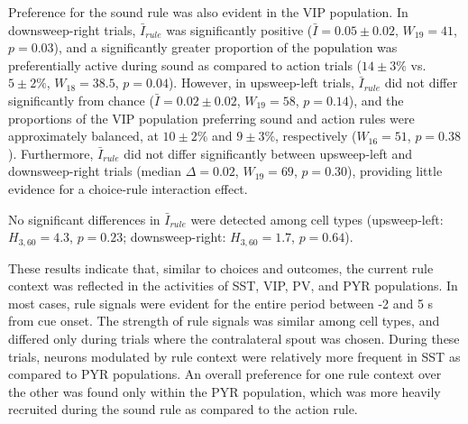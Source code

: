 Preference for the sound rule was also evident in the VIP population. In downsweep-right trials, $\bar{I}_{rule}$ was significantly positive ($\bar{I}=0.05\pm0.02$, $W_{19}=41$, $p=0.03$), and a significantly greater proportion of the population was preferentially active during sound as compared to action trials ($14\pm3\%$ vs. $5\pm2\%$, $W_{18}=38.5$, $p=0.04$). However, in upsweep-left trials, $\bar{I}_{rule}$ did not differ significantly from chance ($\bar{I}=0.02\pm0.02$, $W_{19}=58$, $p=0.14$), and the proportions of the VIP population preferring sound and action rules were approximately balanced, at $10\pm2\%$ and $9\pm3\%$, respectively ($W_{16}=51$, $p=0.38$). Furthermore, $\bar{I}_{rule}$ did not differ significantly between upsweep-left and downsweep-right trials (median $\Delta=0.02$, $W_{19}=69$, $p=0.30$), providing little evidence for a choice-rule interaction effect.

No significant differences in $\bar{I}_{rule}$ were detected among cell types (upsweep-left: $H_{3,60}=4.3$, $p=0.23$; downsweep-right: $H_{3,60}=1.7$, $p=0.64$).

These results indicate that, similar to choices and outcomes, the current rule context was reflected in the activities of SST, VIP, PV, and PYR populations. In most cases, rule signals were evident for the entire period between -2 and 5 s from cue onset. The strength of rule signals was similar among cell types, and differed only during trials where the contralateral spout was chosen. During these trials, neurons modulated by rule context were relatively more frequent in SST as compared to PYR populations. An overall preference for one rule context over the other was found only within the PYR population, which was more heavily recruited during the sound rule as compared to the action rule.             

